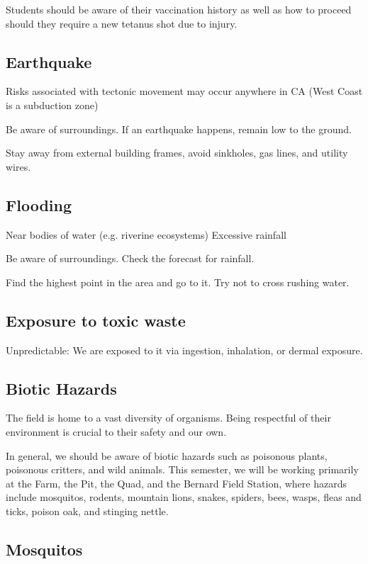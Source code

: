 \documentclass[12pt]{../SOP3_beta}\usepackage[]{graphicx}\usepackage[]{color}
\begin{document}
\NP Students should be aware of their vaccination history as well as how to proceed should they require a new tetanus shot due to injury.

\subsection{Earthquake}

\NP Risks associated with tectonic movement may occur anywhere in CA (West Coast is a subduction zone)

\NP Be aware of surroundings. If an earthquake happens, remain low to the ground.

\NP Stay away from external building frames, avoid sinkholes, gas lines, and utility wires.

\subsection{Flooding}

Near bodies of water (e.g. riverine ecosystems)
Excessive rainfall

\NP Be aware of surroundings. Check the forecast for rainfall.

\NP Find the highest point in the area and go to it. Try not to cross rushing water. 



\subsection{Exposure to toxic waste}


Unpredictable: We are exposed to it via ingestion, inhalation, or dermal exposure.


\subsection{Biotic Hazards}

\NP The field is home to a vast diversity of organisms. Being respectful of their environment is crucial to their safety and our own.

\NP In general, we should be aware of biotic hazards such as poisonous plants, poisonous critters, and wild animals. This semester, we will be working primarily at the Farm, the Pit, the Quad, and the Bernard Field Station, where hazards include mosquitos, rodents, mountain lions, snakes, spiders, bees, wasps, fleas and ticks, poison oak, and stinging nettle.

\subsection{Mosquitos}
\end{document}
